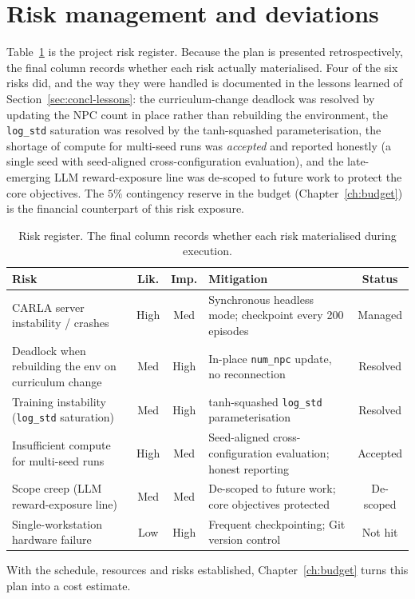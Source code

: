 \section{Risk management and deviations}\label{sec:plan-risk}

Table~\ref{tab:risks} is the project risk register. Because the plan is presented retrospectively,
the final column records whether each risk actually materialised. Four of the six risks did, and
the way they were handled is documented in the lessons learned of
Section~\ref{sec:concl-lessons}: the curriculum-change deadlock was resolved by updating the NPC
count in place rather than rebuilding the environment, the \texttt{log\_std} saturation was
resolved by the tanh-squashed parameterisation, the shortage of compute for multi-seed runs was
\emph{accepted} and reported honestly (a single seed with seed-aligned cross-configuration
evaluation), and the late-emerging LLM reward-exposure line was de-scoped to future work to
protect the core objectives. The \(5\%\) contingency reserve in the budget
(Chapter~\ref{ch:budget}) is the financial counterpart of this risk exposure.

\begin{table}[H]
  \centering
  \caption{Risk register. The final column records whether each risk materialised during
           execution.}
  \label{tab:risks}
  \small
  \begin{tabular}{@{}p{4.4cm}ccp{4.4cm}c@{}}
    \toprule
    \textbf{Risk} & \textbf{Lik.} & \textbf{Imp.} & \textbf{Mitigation} & \textbf{Status} \\
    \midrule
    CARLA server instability / crashes               & High & Med  & Synchronous headless mode; checkpoint every 200 episodes & Managed \\
    Deadlock when rebuilding the env on curriculum change & Med  & High & In-place \texttt{num\_npc} update, no reconnection & Resolved \\
    Training instability (\texttt{log\_std} saturation)   & Med  & High & tanh-squashed \texttt{log\_std} parameterisation & Resolved \\
    Insufficient compute for multi-seed runs         & High & Med  & Seed-aligned cross-configuration evaluation; honest reporting & Accepted \\
    Scope creep (LLM reward-exposure line)           & Med  & Med  & De-scoped to future work; core objectives protected & De-scoped \\
    Single-workstation hardware failure              & Low  & High & Frequent checkpointing; Git version control & Not hit \\
    \bottomrule
  \end{tabular}
\end{table}

With the schedule, resources and risks established, Chapter~\ref{ch:budget} turns this plan into a
cost estimate.

\clearpage
